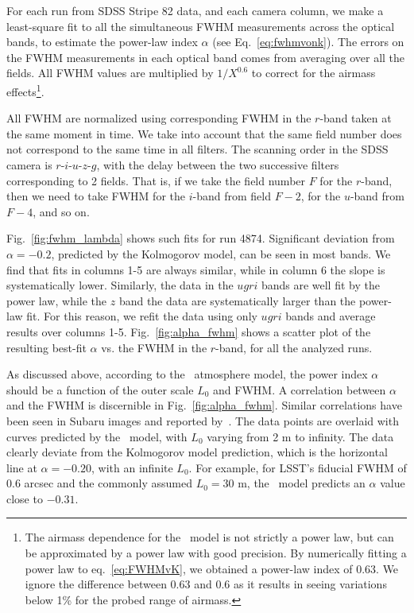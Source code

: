  
For each run from SDSS Stripe 82 data, and each camera column, we make
a least-square fit to all the simultaneous FWHM measurements across the optical bands, to
estimate the power-law index $\alpha$ (see Eq.~\ref{eq:fwhmvonk}). 
The errors on the FWHM measurements in each optical band comes from
averaging over all the fields.
All FWHM values are multiplied by $1/X^{0.6}$ to 
correct for the airmass effects\footnote{The airmass dependence for the \vk~model 
is not strictly a power law, but can be approximated by a power law with good precision.
By numerically fitting a power law to eq.~\ref{eq:FWHMvK}, we obtained a power-law index 
of 0.63. We ignore the difference between 0.63 and 0.6 as it results in seeing variations 
below 1\% for the probed range of airmass.}.

All FWHM are normalized using 
corresponding FWHM in the $r$-band taken at the same moment in time. 
We take into account that the same field number does not correspond to the same
time in all filters. The scanning order in the SDSS camera is $r$-$i$-$u$-$z$-$g$, with the delay between the two 
successive filters corresponding to 2 fields. That is, if we take the field number $F$ for the $r$-band, then
we need to take FWHM for the $i$-band from field $F-2$, for the $u$-band
from $F-4$, and so on. 

Fig.~\ref{fig:fwhm_lambda} shows such fits for run 4874. Significant deviation 
from $\alpha = -0.2$, predicted by the Kolmogorov model, can be seen in most bands.
We find that fits in columns 1-5 are always similar, while in column 6 the slope is 
systematically lower. Similarly, the data in the $ugri$ bands are well fit by the power law, 
while the $z$ band the data are systematically larger than the power-law fit. 
For this reason, we refit the data using only $ugri$ bands and average results
over columns 1-5.  Fig.~\ref{fig:alpha_fwhm} shows a scatter plot of the resulting
best-fit $\alpha$ vs. the FWHM in the $r$-band, for all the analyzed runs.
 
As discussed above, according to the \vk~atmosphere model, the
power index $\alpha$ should be a function of the outer scale $L_0$ and 
FWHM. A correlation between $\alpha$ and the FWHM is discernible in
Fig.~\ref{fig:alpha_fwhm}. Similar correlations have been seen in Subaru images 
and reported by~\cite{subaruSeeing2016}.
The data points are overlaid with curves predicted by the 
\vk~model, with $L_0$ varying from 2 m to infinity.
The data clearly deviate from the Kolmogorov model prediction, which is
the horizontal line at $\alpha = -0.20$, with an infinite $L_0$.
For example, for LSST's fiducial FWHM of 0.6 arcsec and the commonly assumed 
$L_0 = 30$ m, the \vk~model predicts an $\alpha$ value close to $-0.31$.



